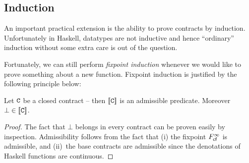 







\subsection{Induction}\label{sect:induction}

An important practical extension is the ability to prove contracts by induction. Unfortunately in 
Haskell, datatypes are not inductive and hence ``ordinary'' induction without some extra care is 
out of the question.

Fortunately, we can still perform {\em fixpoint induction} whenever we would like to prove something 
about a new function. Fixpoint induction is justified by the following principle below:

\begin{lemma} Let ${\tt C}$ be a closed contract -- then $[\![{\tt C}]\!]$ is an 
admissible predicate. Moreover $\bot \in [\![{\tt C}]\!]$. \end{lemma}
\begin{proof}
The fact that $\bot$ belongs in every contract can be proven easily by inspection.
Admissibility follows from the fact that (i) the fixpoint $F_{\textsf{cf}}^{\infty}$ is admissible, 
and (ii)~the base contracts are admissible since the denotations of Haskell functions 
are continuous.
\end{proof}

